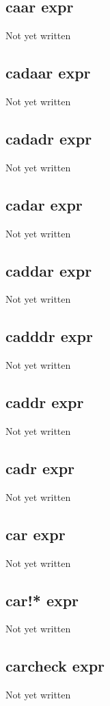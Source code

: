 \documentclass[a4paper,11pt]{article}
\begin{document}
\subsection{\ttfamily caar expr}
Not yet written

\subsection{\ttfamily cadaar expr}
Not yet written

\subsection{\ttfamily cadadr expr}
Not yet written

\subsection{\ttfamily cadar expr}
Not yet written

\subsection{\ttfamily caddar expr}
Not yet written

\subsection{\ttfamily cadddr expr}
Not yet written

\subsection{\ttfamily caddr expr}
Not yet written

\subsection{\ttfamily cadr expr}
Not yet written

\subsection{\ttfamily car expr}
Not yet written

\subsection{\ttfamily car!* expr}
Not yet written

\subsection{\ttfamily carcheck expr}
Not yet written
\end{document}
